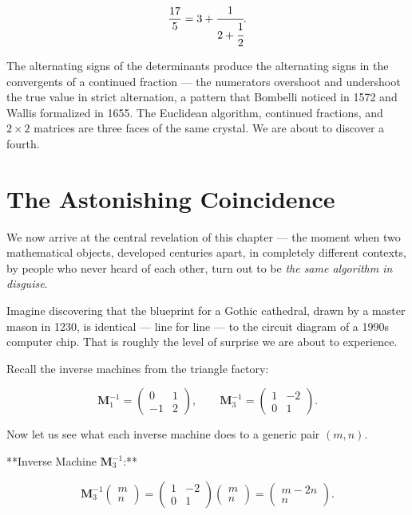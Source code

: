 \[
\frac{17}{5} = 3 + \cfrac{1}{2 + \cfrac{1}{2}}.
\]

The alternating signs of the determinants produce the alternating signs in the convergents of a continued fraction --- the numerators overshoot and undershoot the true value in strict alternation, a pattern that Bombelli noticed in 1572 and Wallis formalized in 1655. The Euclidean algorithm, continued fractions, and $2 \times 2$ matrices are three faces of the same crystal. We are about to discover a fourth.


\bigskip


\section{The Astonishing Coincidence}

We now arrive at the central revelation of this chapter --- the moment when two mathematical objects, developed centuries apart, in completely different contexts, by people who never heard of each other, turn out to be \textit{the same algorithm in disguise}.

Imagine discovering that the blueprint for a Gothic cathedral, drawn by a master mason in 1230, is identical --- line for line --- to the circuit diagram of a 1990s computer chip. That is roughly the level of surprise we are about to experience.

Recall the inverse machines from the triangle factory:

\[
\mathbf{M}_1^{-1} = \begin{pmatrix} 0 & 1 \\ -1 & 2 \end{pmatrix}, \qquad
\mathbf{M}_3^{-1} = \begin{pmatrix} 1 & -2 \\ 0 & 1 \end{pmatrix}.
\]

Now let us see what each inverse machine does to a generic pair $(m, n)$.

**Inverse Machine $\mathbf{M}_3^{-1}$:**

\[
\mathbf{M}_3^{-1} \begin{pmatrix} m \\ n \end{pmatrix} = \begin{pmatrix} 1 & -2 \\ 0 & 1 \end{pmatrix} \begin{pmatrix} m \\ n \end{pmatrix} = \begin{pmatrix} m - 2n \\ n \end{pmatrix}.
\]

